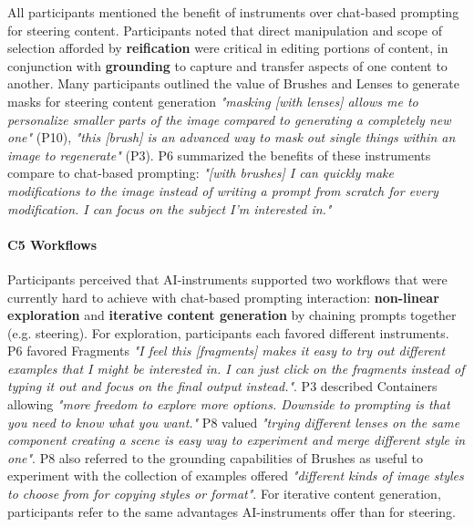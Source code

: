 All participants mentioned the benefit of instruments over chat-based prompting for steering content. Participants noted that direct manipulation and scope of selection afforded by \textbf{reification} were critical in editing portions of content, in conjunction with \textbf{grounding} to capture and transfer aspects of one content to another. Many participants outlined the value of Brushes and Lenses to generate masks for steering content generation \textit{"masking [with lenses] allows me to personalize smaller parts of the image compared to generating a completely new one"} (P10), \textit{"this [brush] is an advanced way to mask out single things within an image to regenerate"} (P3).  P6 summarized the benefits of these instruments compare to chat-based prompting: \textit{"[with brushes] I can quickly make modifications to the image instead of writing a prompt from scratch for every modification. I can focus on the subject I'm interested in."}








\paragraph{\textbf{C5 Workflows}}

Participants perceived that AI-instruments supported two workflows that were currently hard to achieve with chat-based prompting interaction: \textbf{non-linear exploration} and \textbf{iterative content generation} by chaining prompts together (e.g. steering). For exploration, participants each favored different instruments. P6 favored Fragments \textit{"I feel this [fragments] makes it easy to try out different examples that I might be interested in. I can just click on the fragments instead of typing it out and focus on the final output instead."}. P3 described Containers allowing \textit{"more freedom to explore more options. Downside to prompting is that you need to know what you want."} P8 valued \textit{"trying different lenses on the same component creating a scene is easy way to experiment and merge different style in one"}. P8 also referred to the grounding capabilities of Brushes as useful to experiment with the collection of examples offered \textit{"different kinds of image styles to choose from for copying styles or format"}. For iterative content generation, participants refer to the same advantages AI-instruments offer than for steering.



























